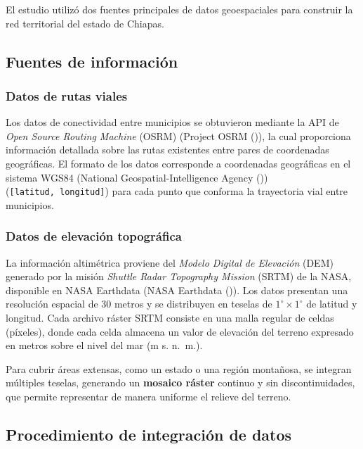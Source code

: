 \documentclass[
  spanish,
  us-letterpaper,
]{scrreprt}
\numberwithin{equation}{section}
\begin{document}
El estudio utilizó dos fuentes principales de datos geoespaciales para
construir la red territorial del estado de Chiapas.

\subsection{Fuentes de información}\label{fuentes-de-informaciuxf3n}

\subsubsection{Datos de rutas viales}\label{datos-de-rutas-viales}

Los datos de conectividad entre municipios se obtuvieron mediante la API
de \emph{Open Source Routing Machine} (OSRM) (Project OSRM
()), la cual proporciona información detallada
sobre las rutas existentes entre pares de coordenadas geográficas. El
formato de los datos corresponde a coordenadas geográficas en el sistema
WGS84 (National Geospatial-Intelligence Agency
()) (\texttt{{[}latitud,\ longitud{]}})
para cada punto que conforma la trayectoria vial entre municipios.

\subsubsection{Datos de elevación
topográfica}\label{datos-de-elevaciuxf3n-topogruxe1fica}

La información altimétrica proviene del \emph{Modelo Digital de
Elevación} (DEM) generado por la misión \emph{Shuttle Radar Topography
Mission} (SRTM) de la NASA, disponible en NASA Earthdata (NASA Earthdata
()). Los datos presentan una
resolución espacial de 30 metros y se distribuyen en teselas de
\(1^\circ \times 1^\circ\) de latitud y longitud. Cada archivo ráster
SRTM consiste en una malla regular de celdas (píxeles), donde cada celda
almacena un valor de elevación del terreno expresado en metros sobre el
nivel del mar (m s. n.~m.).

Para cubrir áreas extensas, como un estado o una región montañosa, se
integran múltiples teselas, generando un \textbf{mosaico ráster}
continuo y sin discontinuidades, que permite representar de manera
uniforme el relieve del terreno.

\subsection{Procedimiento de integración de datos}\label{sec-nominatim2}
\end{document}

